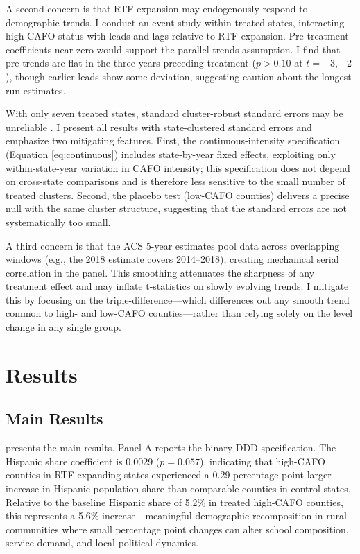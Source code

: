 \documentclass[12pt]{article}
\begin{document}
A second concern is that RTF expansion may endogenously respond to demographic trends. I conduct an event study within treated states, interacting high-CAFO status with leads and lags relative to RTF expansion. Pre-treatment coefficients near zero would support the parallel trends assumption. I find that pre-trends are flat in the three years preceding treatment ($p > 0.10$ at $t = -3, -2$), though earlier leads show some deviation, suggesting caution about the longest-run estimates.

With only seven treated states, standard cluster-robust standard errors may be unreliable \citep{cameron2008bootstrap}. I present all results with state-clustered standard errors and emphasize two mitigating features. First, the continuous-intensity specification (Equation \ref{eq:continuous}) includes state-by-year fixed effects, exploiting only within-state-year variation in CAFO intensity; this specification does not depend on cross-state comparisons and is therefore less sensitive to the small number of treated clusters. Second, the placebo test (low-CAFO counties) delivers a precise null with the same cluster structure, suggesting that the standard errors are not systematically too small.

A third concern is that the ACS 5-year estimates pool data across overlapping windows (e.g., the 2018 estimate covers 2014--2018), creating mechanical serial correlation in the panel. This smoothing attenuates the sharpness of any treatment effect and may inflate t-statistics on slowly evolving trends. I mitigate this by focusing on the triple-difference---which differences out any smooth trend common to high- and low-CAFO counties---rather than relying solely on the level change in any single group.

\section{Results}

\subsection{Main Results}



 presents the main results. Panel A reports the binary DDD specification. The Hispanic share coefficient is 0.0029 ($p = 0.057$), indicating that high-CAFO counties in RTF-expanding states experienced a 0.29 percentage point larger increase in Hispanic population share than comparable counties in control states. Relative to the baseline Hispanic share of 5.2\% in treated high-CAFO counties, this represents a 5.6\% increase---meaningful demographic recomposition in rural communities where small percentage point changes can alter school composition, service demand, and local political dynamics.
\end{document}
